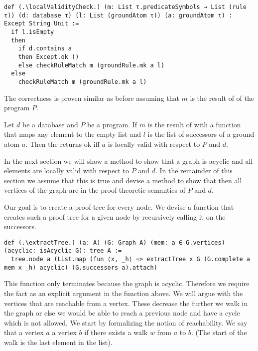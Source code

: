 \begin{lstlisting}
def (.\localValidityCheck.) (m: List τ.predicateSymbols → List (rule τ)) (d: database τ) (l: List (groundAtom τ)) (a: groundAtom τ) : Except String Unit :=
  if l.isEmpty
  then
    if d.contains a
    then Except.ok ()
    else checkRuleMatch m (groundRule.mk a l)
  else
    checkRuleMatch m (groundRule.mk a l)
\end{lstlisting}

The correctness is proven similar as before assuming that $m$ is the result of \parseProgramToSymbolSequenceMap of the program $P$.

\begin{lemma}[\localValidityCheckUnitIffLocallyValid]
    Let $d$ be a database and $P$ be a program. If $m$ is the result of \parseProgramToSymbolSequenceMap with a function that maps any element to the empty list and $l$ is the list of successors of a ground atom $a$. Then the \localValidityCheck returns ok iff $a$ is locally valid with respect to $P$ and $d$.
\end{lemma}

In the next section we will show a method to show that a graph is acyclic and all elements are locally valid with respect to $P$ and $d$. In the remainder of this section we assume that this is true and devise a method to show that then all vertices of the graph are in the proof-theoretic semantics of $P$ and $d$.

Our goal is to create a proof-tree for every node. We devise a function that creates such a proof tree for a given node by recursively calling it on the successors.

\begin{lstlisting}
def (.\extractTree.) (a: A) (G: Graph A) (mem: a ∈ G.vertices) (acyclic: isAcyclic G): tree A :=
  tree.node a (List.map (fun ⟨x, _h⟩ => extractTree x G (G.complete a mem x _h) acyclic) (G.successors a).attach)
\end{lstlisting}

This function only terminates because the graph is acyclic. Therefore we require the fact as an explicit argument in the function above. We will argue with the vertices that are reachable from a vertex. These decrease the further we walk in the graph or else we would be able to reach a previous node and have a cycle which is not allowed. We start by formalizing the notion of reachability. We say that a vertex $a$ \canReach a vertex $b$ if there exists a walk $w$ from $a$ to $b$. (The start of the walk is the last element in the list).

